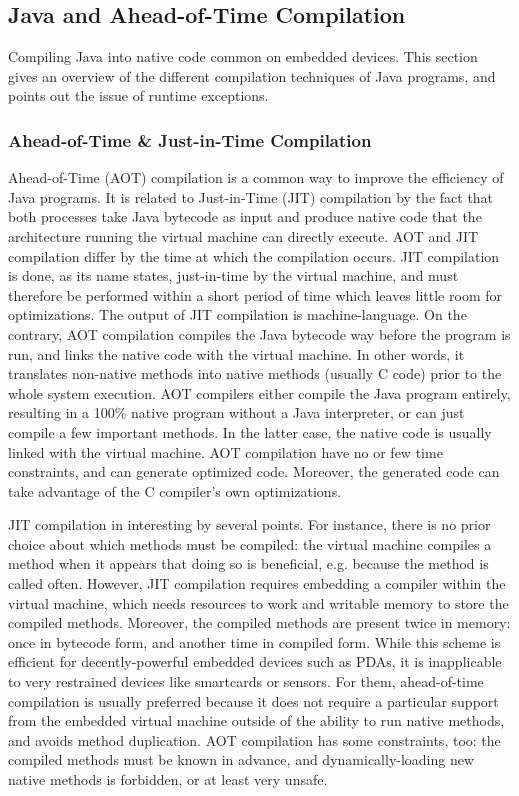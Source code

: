 \subsection{Java and Ahead-of-Time Compilation}
\label{sec:sota}

Compiling Java into native code common on embedded devices. This section gives an overview of the different compilation techniques of Java programs, and points out the issue of runtime exceptions.

\subsubsection{Ahead-of-Time \& Just-in-Time Compilation}

Ahead-of-Time (AOT) compilation is a common way to improve the efficiency of Java programs. It is related to Just-in-Time (JIT) compilation by the fact that both processes take Java bytecode as input and produce native code that the architecture running the virtual machine can directly execute. AOT and JIT compilation differ by the time at which the compilation occurs. JIT compilation is done, as its name states, just-in-time by the virtual machine, and must therefore be performed within a short period of time which leaves little room for optimizations. The output of JIT compilation is machine-language. On the contrary, AOT compilation compiles the Java bytecode way before the program is run, and links the native code with the virtual machine. In other words, it translates non-native methods into native methods (usually C code) prior to the whole system execution. AOT compilers either compile the Java program entirely, resulting in a 100\% native program without a Java interpreter, or can just compile a few important methods. In the latter case, the native code is usually linked with the virtual machine. AOT compilation have no or few time constraints, and can generate optimized code. Moreover, the generated code can take advantage of the C compiler's own optimizations.

JIT compilation in interesting by several points. For instance, there is no prior choice about which methods must be compiled: the virtual machine compiles a method when it appears that doing so is beneficial, e.g. because the method is called often. However, JIT compilation requires embedding a compiler within the virtual machine, which needs resources to work and writable memory to store the compiled methods. Moreover, the compiled methods are present twice in memory: once in bytecode form, and another time in compiled form. While this scheme is efficient for decently-powerful embedded devices such as PDAs, it is inapplicable to very restrained devices like smartcards or sensors. For them, ahead-of-time compilation is usually preferred because it does not require a particular support from the embedded virtual machine outside of the ability to run native methods, and avoids method duplication. AOT compilation has some constraints, too: the compiled methods must be known in advance, and dynamically-loading new native methods is forbidden, or at least very unsafe.


